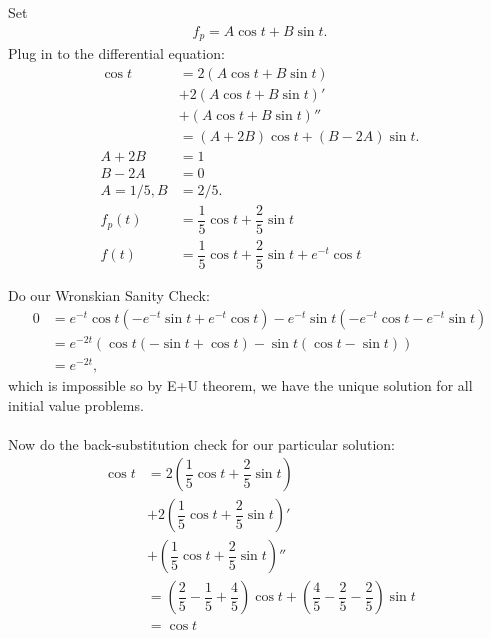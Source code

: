\documentclass[11pt]{article}
\begin{document}
        \begin{solution}[Solution 1b]
            Set 
            \begin{align}
                f_p = A\cos t + B\sin t.
            \end{align}
            Plug in to the differential equation:
            \begin{align}
                \cos t &= 2(A\cos t+B\sin t) \\ 
                &+ 2(A\cos t+B\sin t)' \\
                &+ (A\cos t+B\sin t)'' \\
                &= (A+2B)\cos t+(B-2A)\sin t. \\
                A+2B &= 1 \\
                B-2A &= 0 \\
                A = 1/5, B &= 2/5. \\
                f_p(t) &= \dfrac{1}{5}\cos t + \dfrac{2}{5}\sin t \\
                f(t) &= \dfrac{1}{5}\cos t + \dfrac{2}{5}\sin t + e^{-t}\cos t
            \end{align}
        \end{solution}
        \begin{remark}[Footnotes.]
            Do our Wronskian Sanity Check:
            \begin{align}
                0 &= e^{-t}\cos t (-e^{-t}\sin t + e^{-t} \cos t) - e^{-t}\sin t (-e^{-t}\cos t -e^{-t} \sin t) \\
                &= e^{-2t}(\cos t (-\sin t + \cos t) - \sin t (\cos t - \sin t)) \\ 
                &= e^{-2t},
            \end{align}
            which is impossible so by E+U theorem, we have the unique solution for all initial value problems. \\~\\
            Now do the back-substitution check for our particular solution:
            \begin{align}
                \cos t &= 2\left(\dfrac{1}{5}\cos t + \dfrac{2}{5}\sin t\right) \\ 
                &+ 2\left(\dfrac{1}{5}\cos t + \dfrac{2}{5}\sin t\right)' \\
                &+ \left(\dfrac{1}{5}\cos t + \dfrac{2}{5}\sin t\right)'' \\ 
                &= \left(\dfrac{2}{5}-\dfrac{1}{5}+\dfrac{4}{5}\right) \cos t + \left(\dfrac{4}{5}-\dfrac{2}{5}-\dfrac{2}{5}\right) \sin t \\
                &= \cos t 
            \end{align}
        \end{remark}
\end{document}

